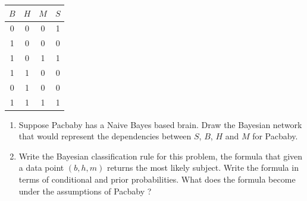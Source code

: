 \documentclass[11pt, a4paper]{article}
\begin{document}
\begin{table}[h]
    \centering
    \begin{tabular}{ccc|c}
        \toprule
        $B$ & $H$ & $M$ & $S$ \\
        \midrule
        0 & 0 & 0 & 1 \\
        1 & 0 & 0 & 0 \\
        1 & 0 & 1 & 1 \\
        1 & 1 & 0 & 0 \\
        0 & 1 & 0 & 0 \\
        1 & 1 & 1 & 1 \\
        \bottomrule
    \end{tabular}
\end{table}

\begin{enumerate}
    \item Suppose Pacbaby has a Naive Bayes based brain. Draw the Bayesian network that would represent the dependencies between $S$, $B$, $H$ and $M$ for Pacbaby.
    
    \begin{solution}
        \begin{center}
        \end{center}
    \end{solution}
    
    \item Write the Bayesian classification rule for this problem, \ie{} the formula that given a data point $(b, h, m)$ returns the most likely subject. Write the formula in terms of conditional and prior probabilities. What does the formula become under the assumptions of Pacbaby ?
    

\end{enumerate}
\end{document}
